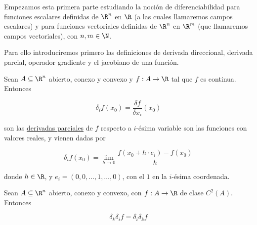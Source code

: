 Empezamos esta primera parte estudiando la noción de diferenciabilidad para funciones escalares definidas de $\R^n$ en $\R$ (a las cuales llamaremos campos escalares) y para funciones vectoriales definidas de $\R^n$ en $\R^m$ (que llamaremos campos vectoriales), con $n,m \in \N$.

Para ello introduciremos primero las definiciones de derivada direccional, derivada parcial, operador gradiente y el jacobiano de una función.

\begin{defn}
    Sean $A \subseteq \R^n$ abierto, conexo y convexo y $f: A \rightarrow \R$ tal que $f$ es continua. Entonces
    
    \[
    \delta_i f(x_0) = \frac{\delta f}{\delta x_i}(x_0)
    \]
    
    \noindent son las \ul{derivadas parciales} de $f$ respecto a $i$-ésima variable son las funciones con valores reales, y vienen dadas por
    
    \[
    \delta_i f(x_0) = \lim_{h \to 0} \frac{f(x_0 + h \cdot e_i) - f(x_0)}{h}
    \]
    
    \noindent donde $h \in \R$, y $e_i = (0, 0, \dots, 1, \dots, 0)$, con el $1$ en la $i$-ésima coordenada.
\end{defn}

\begin{teo}
    Sean $A \subseteq \R^n$ abierto, conexo y convexo, con $f: A \rightarrow \R$ de clase $C^2(A)$. Entonces
    
    \[
    \delta_k\delta_if = \delta_i\delta_kf
    \]
\end{teo}

